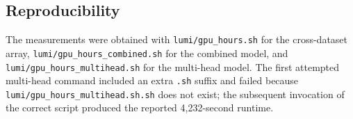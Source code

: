 \subsection*{Reproducibility}

The measurements were obtained with \texttt{lumi/gpu\_hours.sh} for the cross-dataset array, \texttt{lumi/gpu\_hours\_combined.sh} for the combined model, and \texttt{lumi/gpu\_hours\_multihead.sh} for the multi-head model. The first attempted multi-head command included an extra \texttt{.sh} suffix and failed because \texttt{lumi/gpu\_hours\_multihead.sh.sh} does not exist; the subsequent invocation of the correct script produced the reported 4,232-second runtime.
